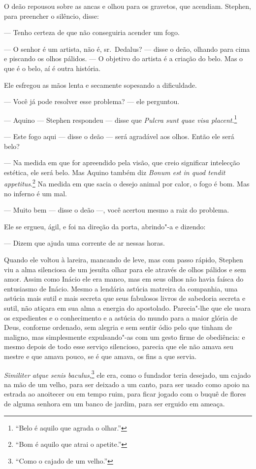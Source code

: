 O deão repousou sobre as ancas e olhou para os gravetos, que acendiam.
Stephen, para preencher o silêncio, disse:

 --- Tenho certeza de que não conseguiria acender um fogo.

 --- O senhor é um artista, não é, sr.~Dedalus? --- disse o deão, olhando para
cima e piscando os olhos pálidos. --- O objetivo do artista é a criação do
belo. Mas o que é o belo, aí é outra história.

Ele esfregou as mãos lenta e secamente sopesando a dificuldade.

 --- Você já pode resolver esse problema? --- ele perguntou.

 --- Aquino --- Stephen respondeu --- disse que \textit{Pulcra sunt quae visa
placent}.\footnote{ “Belo é aquilo que agrada o olhar.”}

 --- Este fogo aqui --- disse o deão --- será agradável aos olhos. Então ele será
belo?

 --- Na medida em que for apreendido pela visão, que creio significar
intelecção estética, ele será belo. Mas Aquino também diz \textit{Bonum
est in quod tendit appetitus}.\footnote{ “Bom é aquilo que atrai o
apetite.”} Na medida em que sacia o desejo animal por calor, o fogo é
bom. Mas no inferno é um mal.

 --- Muito bem --- disse o deão ---, você acertou mesmo a raiz do problema.

Ele se ergueu, ágil, e foi na direção da porta, abrindo"-a e dizendo:

 --- Dizem que ajuda uma corrente de ar nessas horas.

Quando ele voltou à lareira, mancando de leve, mas com passo rápido,
Stephen viu a alma silenciosa de um jesuíta olhar para ele através de
olhos pálidos e sem amor. Assim como Inácio ele era manco, mas em seus
olhos não havia faísca do entusiasmo de Inácio. Mesmo a lendária
astúcia matreira da companhia, uma astúcia mais sutil e mais secreta
que seus fabulosos livros de sabedoria secreta e sutil, não atiçara em
sua alma a energia do apostolado. Parecia"-lhe que ele usara os
expedientes e o conhecimento e a astúcia do mundo para a maior glória
de Deus, conforme ordenado, sem alegria e sem sentir ódio pelo que
tinham de maligno, mas simplesmente expulsando"-as com um gesto firme de
obediência: e mesmo depois de todo esse serviço silencioso, parecia que
ele não amava seu mestre e que amava pouco, se é que amava, os fins a
que servia.

\textit{Similiter atque senis baculus},\footnote{ ``Como o cajado de um velho.''} ele era, como o fundador teria
desejado, um cajado na mão de um velho, para ser deixado a um canto,
para ser usado como apoio na estrada ao anoitecer ou em tempo ruim,
para ficar jogado com o buquê de flores de alguma senhora em um
banco de jardim, para ser erguido em ameaça.

